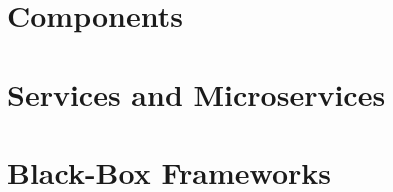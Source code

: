 \documentclass[
	aspectratio=169, %
	8pt, %
]{beamer}
\subtitle{6. Modular Features}
\author{Timo Kehrer, Thomas Thüm, Elias Kuiter}
\begin{document}


\section{Components}



\lessonslearned{
	\item \ldots
}{
	\item \ldots
}{
	\ldots
}

\sectionend

\section{Services and Microservices}



\lessonslearned{
	\item \ldots
}{
	\item \ldots
}{
	\ldots
}

\sectionend

\section{Black-Box Frameworks}



\lessonslearned{
	\item \ldots
}{
	\item \ldots
}{
	\ldots
}


\end{document}
